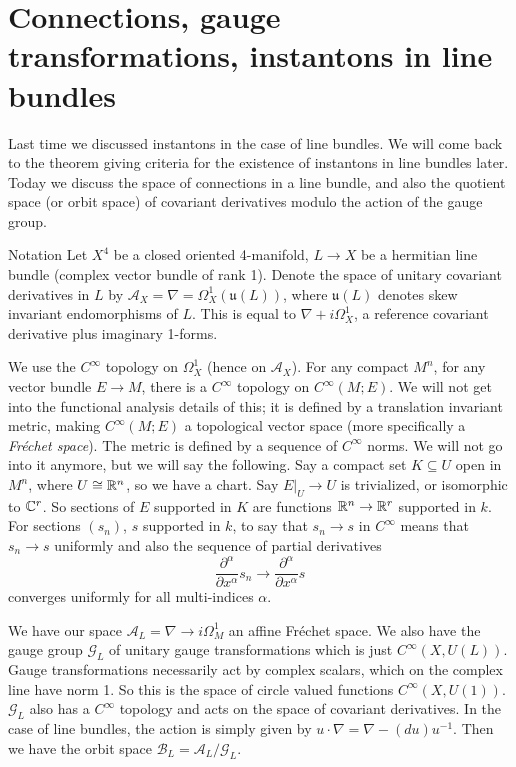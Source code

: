 \section{Connections, gauge transformations, instantons in line bundles} 
Last time we discussed instantons in the case of line bundles. We will come back to the theorem giving criteria for the existence of instantons in line bundles later. Today we discuss the space of connections in a line bundle, and also the quotient space (or orbit space) of covariant derivatives modulo the action of the gauge group. 

\begin{namedthing}{Notation} 
Let $X^4$ be a closed oriented 4-manifold, $L \to X$ be a hermitian line bundle (complex vector bundle of rank 1). Denote the space of unitary covariant derivatives in $L$ by $\mathcal A_X = \nabla = \Omega^1_X (\mathfrak u(L))$, where $\mathfrak u(L)$ denotes skew invariant endomorphisms of $L$. This is equal to $\nabla + i \Omega^1_X$, a reference covariant derivative plus imaginary 1-forms. 
\end{namedthing}

We use the $C ^{\infty}$ topology on $\Omega^1_X$ (hence on $\mathcal A_X$). 
For any compact $M^n $, for any vector bundle $E \to M$, there is a $C ^{\infty}$ topology on $C^{\infty}(M;E)$. We will not get into the functional analysis details of this; it is defined by a translation invariant metric, making $C ^{\infty}(M;E)$ a topological vector space (more specifically a \emph{Fr\'echet space}). The metric is defined by a sequence of $C ^{\infty}$ norms. 
We will not go into it anymore, but we will say the following. Say a compact set $K \subseteq U$ open in $M^n $, where $U \cong  \mathbb{R}^n $, so we have a chart. Say $\left. E \right| _U \to U$ is trivialized, or isomorphic to $\mathbb{C}^r $. So sections of $E$ supported in $K$ are functions $\mathbb{R}^n  \to \mathbb{R}^r$ supported in $k$. For sections $(s_n )$, $s$ supported in $k$, to say that $s_n  \to s$ in $C ^{\infty}$ means that $s _n \to s$ uniformly and also the sequence of partial derivatives\[
\frac{\partial ^{\alpha }}{\partial  x ^{\alpha }}s_n  \to \frac{\partial  ^{\alpha }}{\partial  x ^{\alpha }}s 
\] converges uniformly for all multi-indices $\alpha $.

We have our space $\mathcal A_L = \nabla \to i \Omega^1_M$ an affine Fr\'echet space. We also have the gauge group $\mathcal G_L$ of unitary gauge transformations which is just
$C ^{\infty}(X, U(L))$. Gauge transformations necessarily act by complex scalars, which on the complex line have norm 1. So this is the space of circle valued functions $C ^{\infty}(X, U(1))$. $\mathcal G_L$ also has a $C ^{\infty}$ topology and acts on the space of covariant derivatives. In the case of line bundles, the action is simply given by $u \cdot \nabla = \nabla - (du) u^{-1}$. Then we have the orbit space $\mathcal B_L = \mathcal A_L / \mathcal G_L$.

